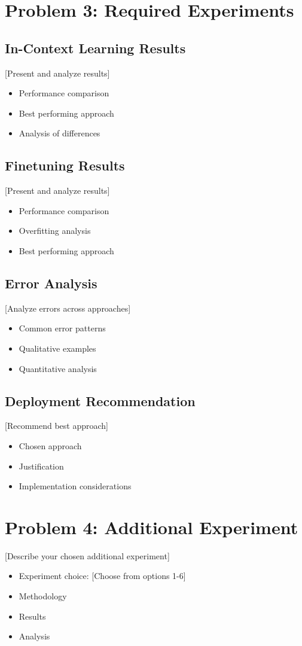 \documentclass{article}
\begin{document}
\section{Problem 3: Required Experiments}

\subsection{In-Context Learning Results}
[Present and analyze results]
\begin{itemize}
    \item Performance comparison
    \item Best performing approach
    \item Analysis of differences
\end{itemize}

\subsection{Finetuning Results}
[Present and analyze results]
\begin{itemize}
    \item Performance comparison
    \item Overfitting analysis
    \item Best performing approach
\end{itemize}

\subsection{Error Analysis}
[Analyze errors across approaches]
\begin{itemize}
    \item Common error patterns
    \item Qualitative examples
    \item Quantitative analysis
\end{itemize}

\subsection{Deployment Recommendation}
[Recommend best approach]
\begin{itemize}
    \item Chosen approach
    \item Justification
    \item Implementation considerations
\end{itemize}

\section{Problem 4: Additional Experiment}
[Describe your chosen additional experiment]
\begin{itemize}
    \item Experiment choice: [Choose from options 1-6]
    \item Methodology
    \item Results
    \item Analysis
\end{itemize}



\end{document}
